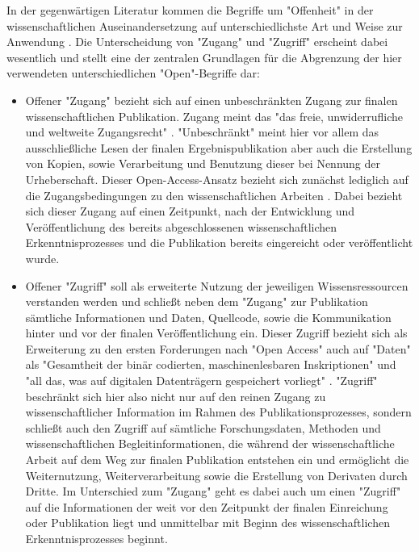 In der gegenwärtigen Literatur kommen die Begriffe um "Offenheit" in der wissenschaftlichen Auseinandersetzung auf unterschiedlichste Art und Weise zur Anwendung \cite{cite:9}. Die Unterscheidung von "Zugang" und "Zugriff" erscheint dabei wesentlich und stellt eine der zentralen Grundlagen für die Abgrenzung der hier verwendeten unterschiedlichen "Open"-Begriffe dar:
\begin{itemize}
\item Offener "Zugang" bezieht sich auf einen unbeschränkten Zugang zur finalen wissenschaftlichen Publikation. Zugang meint das "das freie, unwiderrufliche und
weltweite Zugangsrecht" \cite{berliner_erklaerung_2003}. "Unbeschränkt" meint hier vor allem das ausschließliche Lesen der finalen Ergebnispublikation aber auch die Erstellung von Kopien, sowie Verarbeitung und Benutzung dieser \cite{Lossau_oa_2007} bei Nennung der Urheberschaft. Dieser Open-Access-Ansatz bezieht sich zunächst lediglich auf die Zugangsbedingungen zu den wissenschaftlichen Arbeiten \cite{muller_2010_open}. Dabei bezieht sich dieser Zugang auf einen Zeitpunkt, nach der Entwicklung und Veröffentlichung des bereits abgeschlossenen wissenschaftlichen Erkenntnisprozesses und die Publikation bereits eingereicht oder veröffentlicht wurde.
\item Offener "Zugriff" soll als erweiterte Nutzung der jeweiligen Wissensressourcen verstanden werden und schließt neben dem "Zugang" zur Publikation sämtliche Informationen und Daten, Quellcode, sowie die Kommunikation hinter und vor der finalen Veröffentlichung \cite{hey_2015_open} ein. Dieser Zugriff bezieht sich als Erweiterung zu den ersten Forderungen nach "Open Access" auch auf "Daten" als "Gesamtheit der binär codierten, maschinenlesbaren Inskriptionen" und "all das, was auf digitalen Datenträgern gespeichert vorliegt" \cite{Burkhardt_2015}. "Zugriff" beschränkt sich hier also nicht nur auf den reinen Zugang zu wissenschaftlicher Information im Rahmen des Publikationsprozesses, sondern schließt auch den Zugriff auf sämtliche Forschungsdaten, Methoden und wissenschaftlichen Begleitinformationen, die während der wissenschaftliche Arbeit auf dem Weg zur finalen Publikation entstehen ein und ermöglicht die Weiternutzung, Weiterverarbeitung sowie die Erstellung von Derivaten durch Dritte. Im Unterschied zum "Zugang" geht es dabei auch um einen "Zugriff" auf die Informationen der weit vor den Zeitpunkt der finalen Einreichung oder Publikation liegt und unmittelbar mit Beginn des wissenschaftlichen Erkenntnisprozesses beginnt.
\end{itemize}

